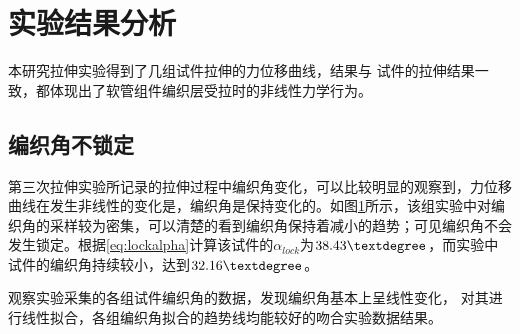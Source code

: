 \newpage



\section{实验结果分析}

本研究拉伸实验得到了几组试件拉伸的力位移曲线，结果与
\ha 试件的拉伸结果一致，都体现出了软管组件编织层受拉时的非线性力学行为。






\subsection{编织角不锁定}

第三次拉伸实验所记录的拉伸过程中编织角变化，可以比较明显的观察到，力位移曲线在发生非线性的变化是，编织角是保持变化的。如图\ref{fig:angle-conclusion}所示，该组实验中对编织角的采样较为密集，可以清楚的看到编织角保持着减小的趋势；可见编织角不会发生锁定。根据\ref{eq:lockalpha}计算该试件的$ \alpha_{lock} $为$ 38.43\textdegree $，而实验中试件的编织角持续较小，达到$ 32.16\textdegree $。

\begin{figure}[!htb]
	\centering
	\label{fig:angle-conclusion}
\end{figure}

观察实验采集的各组试件编织角的数据，发现编织角基本上呈线性变化， 对其进行线性拟合，各组编织角拟合的趋势线均能较好的吻合实验数据结果。




